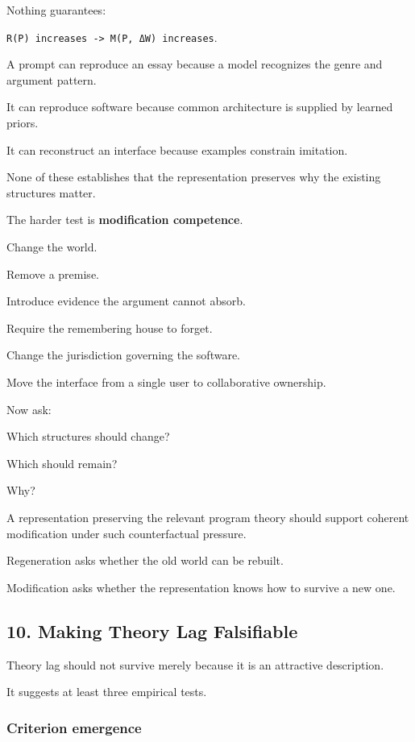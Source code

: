 \documentclass[
]{article}
\begin{document}
Nothing guarantees:

\texttt{R(P)\ increases\ -\textgreater{}\ M(P,\ ΔW)\ increases}.

A prompt can reproduce an essay because a model recognizes the genre and
argument pattern.

It can reproduce software because common architecture is supplied by
learned priors.

It can reconstruct an interface because examples constrain imitation.

None of these establishes that the representation preserves why the
existing structures matter.

The harder test is \textbf{modification competence}.

Change the world.

Remove a premise.

Introduce evidence the argument cannot absorb.

Require the remembering house to forget.

Change the jurisdiction governing the software.

Move the interface from a single user to collaborative ownership.

Now ask:

Which structures should change?

Which should remain?

Why?

A representation preserving the relevant program theory should support
coherent modification under such counterfactual pressure.

Regeneration asks whether the old world can be rebuilt.

Modification asks whether the representation knows how to survive a new
one.

\subsection{10. Making Theory Lag
Falsifiable}\label{making-theory-lag-falsifiable}

Theory lag should not survive merely because it is an attractive
description.

It suggests at least three empirical tests.

\subsubsection{Criterion emergence}\label{criterion-emergence}
\end{document}
